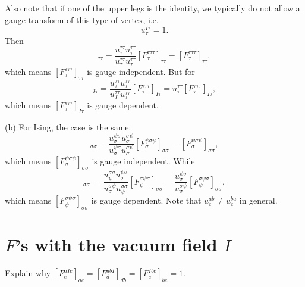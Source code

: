 \documentclass{book}
\begin{document}
Also note that if one of the upper legs is the identity, we typically do not allow a gauge transform of this type of vertex, i.e.
\begin{equation*}
u_{\tau }^{I\tau } =1.
\end{equation*}
Then
\begin{equation*}
[\tilde{F}_{\tau }^{\tau \tau \tau } ]_{\tau \tau } =\frac{u_{\tau }^{\tau \tau } u_{\tau }^{\tau \tau }}{u_{\tau }^{\tau \tau } u_{\tau }^{\tau \tau }} [F_{\tau }^{\tau \tau \tau } ]_{\tau \tau } =[F_{\tau }^{\tau \tau \tau } ]_{\tau \tau } ,
\end{equation*}
which means $[F_{\tau }^{\tau \tau \tau } ]_{\tau \tau }$ is gauge independent. But for
\begin{equation*}
[\tilde{F}_{\tau }^{\tau \tau \tau } ]_{I\tau } =\frac{u_{\tau }^{\tau \tau } u_{\tau }^{\tau \tau }}{u_{I}^{\tau \tau } u_{\tau }^{\tau \tau }} [F_{\tau }^{\tau \tau \tau } ]_{I\tau } =u_{\tau }^{\tau \tau } [F_{\tau }^{\tau \tau \tau } ]_{I\tau } ,
\end{equation*}
which means $[F_{\tau }^{\tau \tau \tau } ]_{I\tau }$ is gauge dependent. 



(b) For Ising, the case is the same:
\begin{equation*}
[\tilde{F}_{\sigma }^{\psi \sigma \psi } ]_{\sigma \sigma } =\frac{u_{\sigma }^{\psi \sigma } u_{\sigma }^{\sigma \psi }}{u_{\sigma }^{\psi \sigma } u_{\sigma }^{\sigma \psi }} [F_{\sigma }^{\psi \sigma \psi } ]_{\sigma \sigma } =[F_{\sigma }^{\psi \sigma \psi } ]_{\sigma \sigma } ,
\end{equation*}
which means $[F_{\sigma }^{\psi \sigma \psi } ]_{\sigma \sigma }$ is gauge independent. While
\begin{equation*}
[\tilde{F}_{\psi }^{\sigma \psi \sigma } ]_{\sigma \sigma } =\ \frac{u_{\psi }^{\sigma \sigma } u_{\sigma }^{\psi \sigma }}{u_{\sigma }^{\sigma \psi } u_{\psi }^{\sigma \sigma }} [F_{\psi }^{\sigma \psi \sigma } ]_{\sigma \sigma } =\frac{u_{\sigma }^{\psi \sigma }}{u_{\sigma }^{\sigma \psi }} [F_{\psi }^{\sigma \psi \sigma } ]_{\sigma \sigma } ,
\end{equation*}
which means $[F_{\psi }^{\sigma \psi \sigma } ]_{\sigma \sigma }$ is gauge dependent. Note that $u_{c}^{ab} \neq u_{c}^{ba}$ in general. 

\section{$F$\textbf{'s with the vacuum field }$I$}
Explain why $[F_{e}^{aIc} ]_{ac} =[F_{d}^{abI} ]_{db} =[F_{e}^{Ibc} ]_{be} =1$.
\end{document}
